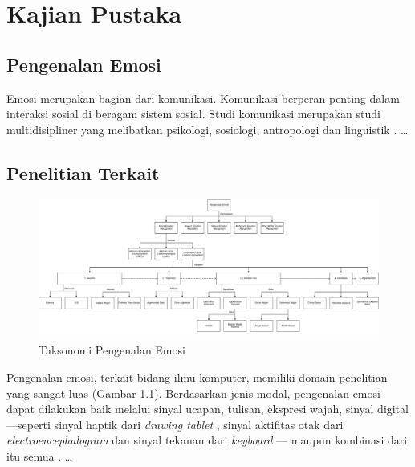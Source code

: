 \chapter{Kajian Pustaka}

\section{Pengenalan Emosi}
Emosi merupakan bagian dari komunikasi. Komunikasi berperan penting dalam interaksi sosial di beragam sistem sosial. Studi komunikasi merupakan studi multidisipliner yang melibatkan psikologi, sosiologi, antropologi dan linguistik . \dots

\section{Penelitian Terkait}
\begin{figure}
    \centering
    \includegraphics[width=14cm]{gambar/taksonomi_pengenalan_emosi.png}
    \caption[Taksonomi Pengenalan Emosi]{Taksonomi Pengenalan Emosi \protect{}}
    \label{fig:taksonomiemosi}
\end{figure}
Pengenalan emosi, terkait bidang ilmu komputer, memiliki domain penelitian yang sangat luas (Gambar \ref{fig:taksonomiemosi}). Berdasarkan jenis modal, pengenalan emosi dapat dilakukan baik melalui sinyal ucapan, tulisan, ekspresi wajah, sinyal digital ---seperti sinyal haptik dari \textit{drawing tablet} , sinyal aktifitas otak dari \textit{electroencephalogram}  dan sinyal tekanan dari \textit{keyboard} --- maupun kombinasi dari itu semua . \dots

